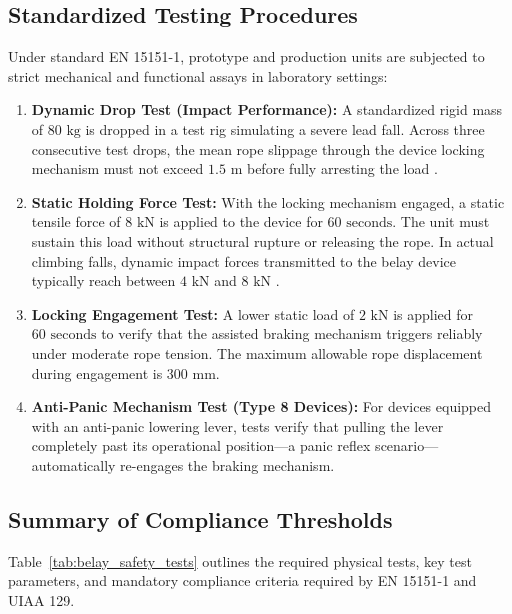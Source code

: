 \subsection{Standardized Testing Procedures}

Under standard EN 15151-1, prototype and production units are subjected to strict mechanical and functional assays in laboratory settings:

\begin{enumerate}
    \item \textbf{Dynamic Drop Test (Impact Performance):} A standardized rigid mass of $80\text{ kg}$ is dropped in a test rig simulating a severe lead fall. Across three consecutive test drops, the mean rope slippage through the device locking mechanism must not exceed $1.5\text{ m}$ before fully arresting the load \cite{en15151_1}.
    \item \textbf{Static Holding Force Test:} With the locking mechanism engaged, a static tensile force of $8\text{ kN}$ is applied to the device for $60\text{ seconds}$. The unit must sustain this load without structural rupture or releasing the rope. In actual climbing falls, dynamic impact forces transmitted to the belay device typically reach between $4\text{ kN}$ and $8\text{ kN}$ \cite{TFM_Sentinel_2026}.
    \item \textbf{Locking Engagement Test:} A lower static load of $2\text{ kN}$ is applied for $60\text{ seconds}$ to verify that the assisted braking mechanism triggers reliably under moderate rope tension. The maximum allowable rope displacement during engagement is $300\text{ mm}$.
    \item \textbf{Anti-Panic Mechanism Test (Type 8 Devices):} For devices equipped with an anti-panic lowering lever, tests verify that pulling the lever completely past its operational position—a panic reflex scenario—automatically re-engages the braking mechanism.
\end{enumerate}

\subsection{Summary of Compliance Thresholds}

Table~\ref{tab:belay_safety_tests} outlines the required physical tests, key test parameters, and mandatory compliance criteria required by EN 15151-1 and UIAA 129.

